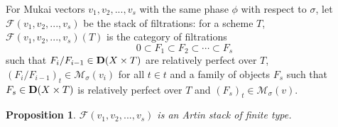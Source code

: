 \documentclass[leqno,11pt]{amsart}
\newtheorem{Prop}[Thm]{Proposition}
\theoremstyle{definition}
\def\FF{\ensuremath{\mathcal F}}
\def\MM{\ensuremath{\mathcal M}}
\begin{document}
For Mukai vectors $v_1,v_2,...,v_s$ with the same phase $\phi$ with respect to $\sigma$, 
let $\FF(v_1,v_2,...,v_s)$ be the stack of filtrations:
for a scheme $T$, 
$\FF(v_1,v_2,...,v_s)(T)$ is the category of filtrations
\begin{equation}
0 \subset F_1 \subset F_2 \subset \cdots \subset F_s
\end{equation} 
such that $F_i/F_{i-1} \in {\bf D}(X \times T)$ are relatively perfect over $T$, 
$(F_i/F_{i-1})_t \in \MM_{\sigma}(v_i)$ for all $t \in t$ 
and a family of objects $F_s$ such that
$F_s \in {\bf D}(X \times T)$ is relatively perfect over $T$ and
$(F_s)_t \in \MM_{\sigma}(v)$.

\begin{Prop}
$\FF(v_1,v_2,...,v_s)$ is an Artin stack of finite type.
\end{Prop}
\end{document}
